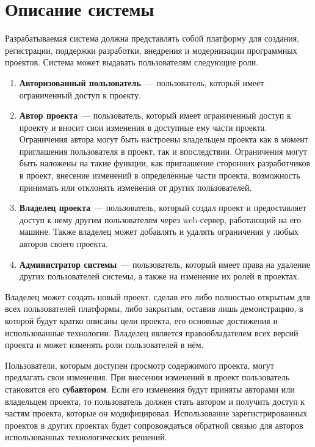 \documentclass{bmstu}
\begin{document}
  \section{Описание системы} \label{chapter:system-description}

  Разрабатываемая система должна представлять собой платформу для
  создания, регистрации, поддержки разработки, внедрения и
  модернизации программных проектов.
  Система может выдавать пользователям следующие роли.
  \begin{enumerate}[label*=\arabic*.]
    \item \textbf{Авторизованный пользователь}~--- пользователь,
      который имеет ограниченный доступ к проекту.
    \item \textbf{Автор проекта}~--- пользователь, который имеет
      ограниченный доступ к проекту и вносит свои изменения в
      доступные ему части проекта. Ограничения автора могут быть
      настроены владельцем проекта как в момент приглашения
      пользователя в проект, так и впоследствии. Ограничения могут
      быть наложены на такие функции, как приглашение сторонних
      разработчиков в проект, внесение изменений в определённые части
      проекта, возможность принимать или отклонять изменения от других
      пользователей.
    \item \textbf{Владелец проекта}~--- пользователь, который создал
      проект и предоставляет доступ к нему другим пользователям через
      web-сервер, работающий на его машине. Также владелец может
      добавлять и удалять ограничения у любых авторов своего проекта.
    \item \textbf{Администратор системы}~--- пользователь, который
      имеет права на удаление других пользователей системы, а также на
      изменение их ролей в проектах.
  \end{enumerate}

  Владелец может создать новый проект, сделав его либо полностью
  открытым для всех пользователей платформы, либо закрытым, оставив
  лишь демонстрацию, в которой будут кратко описаны цели проекта, его
  основные достижения и использованные технологии.
  Владелец является правообладателем всех версий проекта и может
  изменять роли пользователей в нём.

  Пользователи, которым доступен просмотр содержимого проекта, могут
  предлагать свои изменения.
  При внесении изменений в проект пользователь становится его
  \textbf{субавтором}.
  Если его изменения будут приняты авторами или владельцем проекта, то
  пользователь должен стать автором и получить доступ к частям
  проекта, которые он модифицировал.
  Использование зарегистрированных проектов в других проектах будет
  сопровождаться обратной связью для авторов использованных
  технологических решений.
\end{document}
